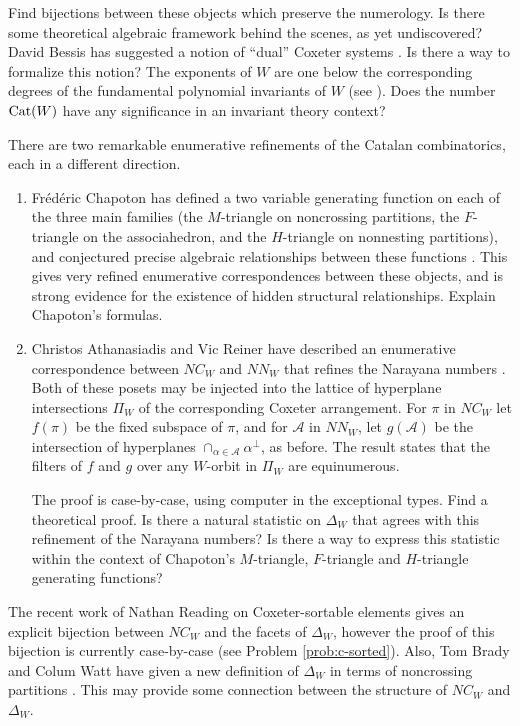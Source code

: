 \documentclass[12pt,letterpaper, reqno]{amsart}
\newcommand{\Cat}{{\rm Cat}}
\newcommand{\A}{\mathcal A}
\begin{document}
\begin{problemblock}
\begin{problem}
Find bijections between these objects which preserve the numerology. Is
there some theoretical algebraic framework behind the scenes, as
yet undiscovered? David Bessis has suggested a notion of ``dual''
Coxeter systems \cite{bessis:dual}. Is there a way to formalize this
notion? The exponents of $W$ are one below the corresponding degrees of
the fundamental polynomial invariants of $W$ (see \cite{humphries}). Does
the number $\Cat(W)$ have any significance in an invariant theory context?
\end{problem}

\begin{remark}
 There are two remarkable enumerative refinements of the Catalan combinatorics, each in a different direction.
\begin{enumerate}
\item Fr\'ed\'eric Chapoton has defined a two variable generating function
on each of the three main families (the $M$-triangle on noncrossing
partitions, the $F$-triangle on the associahedron, and the $H$-triangle
on nonnesting partitions), and conjectured precise algebraic relationships
between these functions \cite{chapoton:one,chapoton:two}. This gives very
refined enumerative correspondences between these objects, and is strong
evidence for the existence of hidden structural relationships. Explain
Chapoton's formulas.

\item Christos Athanasiadis and Vic Reiner have described an enumerative
correspondence between $NC_W$ and $NN_W$ that refines the Narayana numbers
\cite{athanasiadis-reiner}. Both of these posets may be injected into the
lattice of hyperplane intersections $\Pi_W$ of the corresponding Coxeter
arrangement. For $\pi$ in $NC_W$ let $f(\pi)$ be the fixed subspace
of $\pi$, and for $\A$ in $NN_W$, let $g(\A)$ be the intersection of
hyperplanes $\cap_{\alpha\in\A} \alpha^{\perp}$, as before. The result
states that the filters of $f$ and $g$ over any $W$-orbit in $\Pi_W$
are equinumerous.

The proof is case-by-case, using computer in the exceptional types. Find
a theoretical proof. Is there a natural statistic on $\Delta_W$ that
agrees with this refinement of the Narayana numbers? Is there a way to
express this statistic within the context of Chapoton's $M$-triangle,
$F$-triangle and $H$-triangle generating functions?
\end{enumerate}
\end{remark}

\begin{remark}The recent work of Nathan Reading on Coxeter-sortable elements
\cite{reading} gives an explicit bijection between $NC_W$ and the
facets of $\Delta_W$, however the proof of this bijection is currently
case-by-case (see Problem \ref{prob:c-sorted}). Also, Tom Brady and Colum
Watt have given a new definition of $\Delta_W$ in terms of noncrossing
partitions \cite{brady-watt}. This may provide some connection between
the structure of $NC_W$ and $\Delta_W$.
\end{remark}

\end{problemblock}
\end{document}
